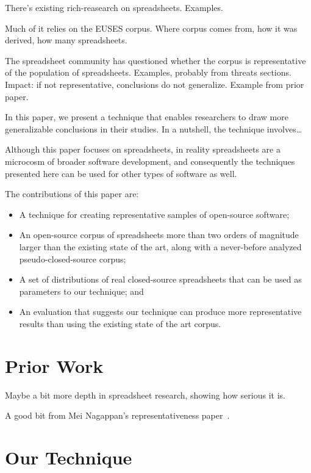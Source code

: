 \documentclass{sig-alternate} %
\begin{document}
There's existing rich-reasearch on spreadsheets.
Examples.

Much of it relies on the EUSES corpus.
Where corpus comes from, how it was derived, how many spreadsheets.

The spreadsheet community has questioned whether the corpus
is representative of the population of spreadsheets.
Examples, probably from threats sections.
Impact: if not representative, conclusions do not generalize.
Example from prior paper.

In this paper, we present a technique that enables researchers
to draw more generalizable conclusions in their studies.
In a nutshell, the technique involves\ldots

Although this paper focuses on spreadsheets, in reality 
spreadsheets are a microcosm of broader software development,
and consequently the techniques presented here can be used for other 
types of software as well.

The contributions of this paper are:

\begin{itemize}
  \item A technique for creating representative samples of open-source
  		software;
  \item An open-source corpus of spreadsheets more than two orders of magnitude larger
 		than the existing state of the art, along with a never-before analyzed
 		pseudo-closed-source corpus;
  \item A set of distributions of real closed-source spreadsheets that can be
  		used as parameters to our technique; and
  \item An evaluation that suggests our technique can produce more representative
  		results than using the existing state of the art corpus.
\end{itemize}

\section{Prior Work}

Maybe a bit more depth in spreadsheet research, showing how serious it is.

A good bit from Mei Nagappan's representativeness paper~\cite{nag13}.

\section{Our Technique}
\end{document}
